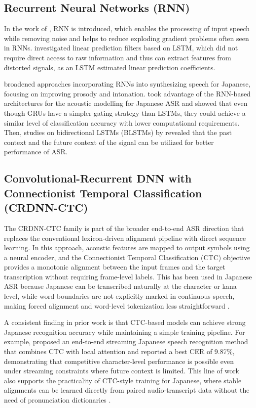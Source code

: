 \subsection{Recurrent Neural Networks (RNN)}
In the work of \textcite{takeuchi2020real}, RNN is introduced, which enables the processing of input speech while removing noise and helps to reduce exploding gradient problems often seen in RNNs. \textcite{Kida2016LSTM} investigated linear prediction filters based on LSTM, which did not require direct access to raw information and thus can extract features from distorted signals, as an LSTM estimated linear prediction coefficients.

\textcite{Kubo2014DeepLearning} broadened approaches incorporating RNNs into synthesizing speech for Japanese, focusing on improving prosody and intonation. \textcite{takeuchi2020real} took advantage of the RNN-based architectures for the acoustic modelling for Japanese ASR and showed that even though GRUs have a simpler gating strategy than LSTMs, they could achieve a similar level of classification accuracy with lower computational requirements. Then, studies on bidirectional LSTMs (BLSTMs) by \textcite{imaizumi2022} revealed that the past context and the future context of the signal can be utilized for better performance of ASR.

\subsection{Convolutional-Recurrent DNN with Connectionist Temporal Classification (CRDNN-CTC)}
The CRDNN-CTC family is part of the broader end-to-end ASR direction that replaces the conventional lexicon-driven alignment pipeline with direct sequence learning. In this approach, acoustic features are mapped to output symbols using a neural encoder, and the Connectionist Temporal Classification (CTC) objective provides a monotonic alignment between the input frames and the target transcription without requiring frame-level labels. This has been used in Japanese ASR because Japanese can be transcribed naturally at the character or kana level, while word boundaries are not explicitly marked in continuous speech, making forced alignment and word-level tokenization less straightforward \parencite{watanabe2017hybrid, watanabe2018espnetendtoendspeechprocessing}.

A consistent finding in prior work is that CTC-based models can achieve strong Japanese recognition accuracy while maintaining a simple training pipeline. For example, \textcite{chen2020streaming} proposed an end-to-end streaming Japanese speech recognition method that combines CTC with local attention and reported a best CER of 9.87\%, demonstrating that competitive character-level performance is possible even under streaming constraints where future context is limited. This line of work also supports the practicality of CTC-style training for Japanese, where stable alignments can be learned directly from paired audio-transcript data without the need of pronunciation dictionaries \parencite{chen2020streaming}.

